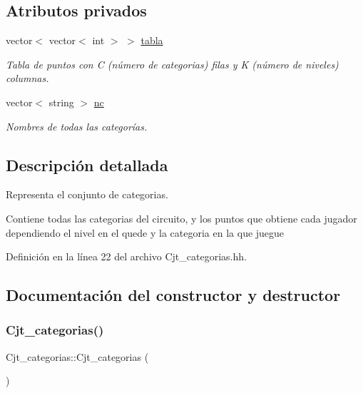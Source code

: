 \subsection*{Atributos privados}
\begin{DoxyCompactItemize}
\item 
vector$<$ vector$<$ int $>$ $>$ \hyperlink{class_cjt__categorias_af03722d79d2b1ec784954dd13a7168eb}{tabla}
\begin{DoxyCompactList}\small\item\em Tabla de puntos con C (número de categorias) filas y K (número de niveles) columnas. \end{DoxyCompactList}\item 
vector$<$ string $>$ \hyperlink{class_cjt__categorias_aad3febb4a17038ba65b2f79a4a509289}{nc}
\begin{DoxyCompactList}\small\item\em Nombres de todas las categorías. \end{DoxyCompactList}\end{DoxyCompactItemize}


\subsection{Descripción detallada}
Representa el conjunto de categorias. 

Contiene todas las categorias del circuito, y los puntos que obtiene cada jugador dependiendo el nivel en el quede y la categoria en la que juegue 

Definición en la línea 22 del archivo Cjt\+\_\+categorias.\+hh.



\subsection{Documentación del constructor y destructor}
\mbox{\label{class_cjt__categorias_acb1bba449ac618047f1ac5f9f7756ec1}} 
\subsubsection{\texorpdfstring{Cjt\+\_\+categorias()}{Cjt\_categorias()}}
{\footnotesize\ttfamily Cjt\+\_\+categorias\+::\+Cjt\+\_\+categorias (\begin{DoxyParamCaption}{ }\end{DoxyParamCaption})}



